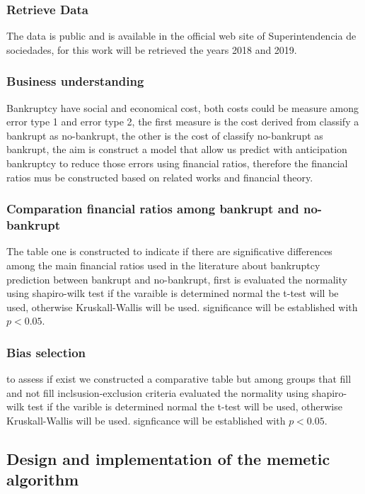 \documentclass[journal]{IEEEtai}
\begin{document}
\subsubsection{ Retrieve Data}
The data is public and is available in the official web site of Superintendencia de sociedades, for this work  will be retrieved the years 2018 and 2019.



\subsubsection{Business understanding}

Bankruptcy have social and economical cost, both costs could be measure among error type 1 and error type 2, the first measure is the cost derived  from classify a bankrupt as no-bankrupt,  the other is the cost of classify  no-bankrupt as bankrupt, the aim is construct a model that allow us predict with anticipation bankruptcy to reduce those errors using financial ratios, therefore the financial ratios mus be constructed based on related works and financial theory.
\subsubsection{Comparation financial ratios among bankrupt and no-bankrupt}
The table one is constructed to indicate if there are significative differences among the main financial ratios used in the literature about bankruptcy prediction between bankrupt and no-bankrupt, first is evaluated the normality using shapiro-wilk test if the varaible is determined normal the t-test will be used, otherwise Kruskall-Wallis will be used. significance will be established with  $p<0.05$.

\subsubsection{Bias selection}
to assess if exist  we constructed a comparative table but among groups that fill and not fill inclsusion-exclusion criteria evaluated the normality using shapiro-wilk test if the varible is determined normal the t-test will be used, otherwise Kruskall-Wallis will be used. signficance will be established with  $p<0.05$.

\subsection{\textbf{Design and implementation of the memetic algorithm}}
\end{document}
